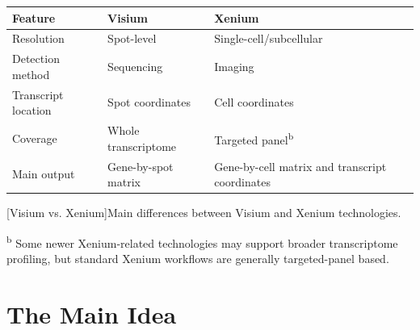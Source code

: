\begin{center}
\begin{minipage}{\textwidth}
\centering
\small

\begin{tabular}{|p{}|p{}|p{}|}
\hline
\textbf{Feature} & \textbf{Visium} & \textbf{Xenium} \\
\hline
Resolution & Spot-level & Single-cell/subcellular \\
\hline
Detection method & Sequencing & Imaging \\
\hline
Transcript location & Spot coordinates & Cell coordinates \\
\hline
Coverage & Whole transcriptome & Targeted panel\textsuperscript{b} \\
\hline
Main output & Gene-by-spot matrix & Gene-by-cell matrix and transcript coordinates \\
\hline
\end{tabular}

\vspace{0.5em}

[Visium vs. Xenium]{Main differences between Visium and Xenium technologies.}

\vspace{0.3em}

\raggedright
\footnotesize
\textsuperscript{b} Some newer Xenium-related technologies may support broader transcriptome profiling, but standard Xenium workflows are generally targeted-panel based.

\end{minipage}
\end{center}

\section{The Main Idea}

